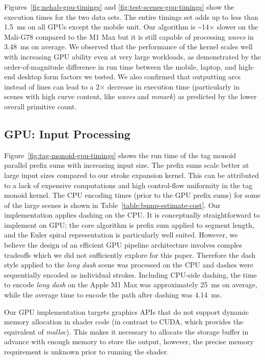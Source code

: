 \documentclass[sigconf, nonacm]{acmart}
\begin{document}
Figures~\ref{fig:nehab-gpu-timings} and \ref{fig:test-scenes-gpu-timings} show the execution times for the two data sets. The entire \citet{Nehab2020} timings set adds up to less than 1.5~ms on all GPUs except the mobile unit. Our algorithm is \textasciitilde14$\times$ slower on the Mali-G78 compared to the M1 Max but it is still capable of processing \emph{waves} in 3.48~ms on average. We observed that the performance of the kernel scales well with increasing GPU ability even at very large workloads, as demonstrated by the order-of-magnitude difference in run time between the mobile, laptop, and high-end desktop form factors we tested. We also confirmed that outputting arcs instead of lines can lead to a 2$\times$ decrease in execution time (particularly in scenes with high curve content, like \emph{waves} and \emph{mmark}) as predicted by the lower overall primitive count.

\subsection{GPU: Input Processing} \label{subsection:encoding-results}

Figure~\ref{fig:tag-monoid-gpu-timings} shows the run time of the tag monoid parallel prefix sums with increasing input size. The prefix sums scale better at large input sizes compared to our stroke expansion kernel. This can be attributed to a lack of expensive computations and high control-flow uniformity in the tag monoid kernel. The CPU encoding times (prior to the GPU prefix sums) for some of the large scenes is shown in Table~\ref{table:bump-estimate-cost}. Our implementation applies dashing on the CPU. It is conceptually straightforward to implement on GPU; the core algorithm is prefix sum applied to segment length, and the Euler spiral representation is particularly well suited. However, we believe the design of an efficient GPU pipeline architecture involves comples tradeoffs which we did not sufficiently explore for this paper. Therefore the dash style applied to the \emph{long dash} scene was processed on the CPU and dashes were sequentially encoded as individual strokes. Including CPU-side dashing, the time to encode \emph{long dash} on the Apple M1 Max was approximately 25~ms on average, while the average time to encode the path after dashing was 4.14~ms.

Our GPU implementation targets graphics APIs that do not support dynamic memory allocation in shader code (in contrast to CUDA, which provides the equivalent of \emph{malloc}). This makes it necessary to allocate the storage buffer in advance with enough memory to store the output, however, the precise memory requirement is unknown prior to running the shader.
\end{document}
